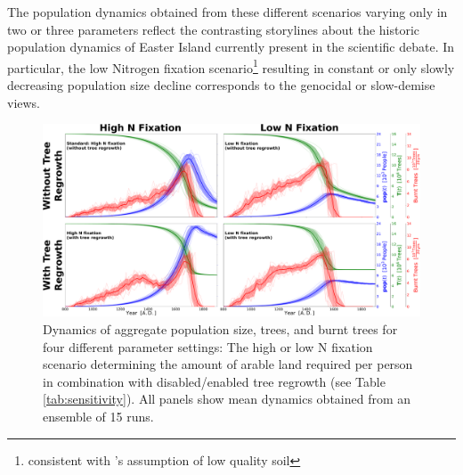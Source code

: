 The population dynamics obtained from these different scenarios varying only in two or three parameters reflect the contrasting storylines about the historic population dynamics of Easter Island currently present in the scientific debate.
In particular, the low Nitrogen fixation scenario\footnote{consistent with \citet{Hunt2007}'s assumption of low quality soil} resulting in constant or only slowly decreasing population size decline corresponds to the genocidal \citep{Hunt2007} or slow-demise \citep{Brandt2015} views.



\begin{figure}
	\centering
	\includegraphics[width=1.3\textwidth, center]{images/Results/Standard/EnsembleStatistics_allTheories}
	\caption{Dynamics of aggregate population size, trees, and burnt trees for four different parameter settings: The high or low N fixation scenario determining the amount of arable land required per person in combination with disabled/enabled tree regrowth (see Table \ref{tab:sensitivity}).
		All panels show mean dynamics obtained from an ensemble of 15 runs.}
	\label{fig:ensemblestatisticsalltheories}
\end{figure}

